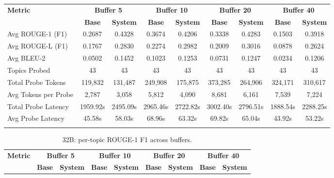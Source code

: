 \documentclass[pdflatex,sn-mathphys-num]{sn-jnl}%
\theoremstyle{thmstyleone}%
\theoremstyle{thmstyletwo}%
\theoremstyle{thmstylethree}%
\begin{document}
\begin{appendices}
\begin{landscape}
\begin{longtable}{@{}p{3.8cm}cccccccc@{}}
\toprule
\textbf{Metric} & \multicolumn{2}{c}{\textbf{Buffer 5}} & \multicolumn{2}{c}{\textbf{Buffer 10}} & \multicolumn{2}{c}{\textbf{Buffer 20}} & \multicolumn{2}{c}{\textbf{Buffer 40}} \\
\cmidrule(lr){2-3}\cmidrule(lr){4-5}\cmidrule(lr){6-7}\cmidrule(lr){8-9}
 & \textbf{Base} & \textbf{System} & \textbf{Base} & \textbf{System} & \textbf{Base} & \textbf{System} & \textbf{Base} & \textbf{System} \\
\midrule
\endhead
Avg ROUGE-1 (F1) & 0.2687 & 0.4328 & 0.3674 & 0.4206 & 0.3338 & 0.4283 & 0.1503 & 0.3918 \\
Avg ROUGE-L (F1) & 0.1767 & 0.2830 & 0.2274 & 0.2982 & 0.2009 & 0.3016 & 0.0878 & 0.2624 \\
Avg BLEU-2 & 0.0502 & 0.1452 & 0.1023 & 0.1253 & 0.0731 & 0.1247 & 0.0234 & 0.1206 \\
Topics Probed & 43 & 43 & 43 & 43 & 43 & 43 & 43 & 43 \\
Total Probe Tokens & 119,832 & 131,487 & 249,908 & 175,875 & 373,285 & 264,906 & 324,171 & 310,617 \\
Avg Tokens per Probe & 2,787 & 3,058 & 5,812 & 4,090 & 8,681 & 6,161 & 7,539 & 7,224 \\
Total Probe Latency & 1959.92s & 2495.09s & 2965.46s & 2722.82s & 3002.40s & 2796.51s & 1888.54s & 2288.25s \\
Avg Probe Latency & 45.58s & 58.03s & 68.96s & 63.32s & 69.82s & 65.04s & 43.92s & 53.22s \\
\botrule
\end{longtable}
\normalsize
\end{landscape}
\begin{landscape}
\tiny
\begin{longtable}{@{}p{3.8cm}cccccccc@{}}
\caption{32B: per-topic ROUGE-1 F1 across buffers.}\label{tab:app_32b_rouge1_topics}\\

\toprule
\textbf{Metric} & \multicolumn{2}{c}{\textbf{Buffer 5}} & \multicolumn{2}{c}{\textbf{Buffer 10}} & \multicolumn{2}{c}{\textbf{Buffer 20}} & \multicolumn{2}{c}{\textbf{Buffer 40}} \\
\cmidrule(lr){2-3}\cmidrule(lr){4-5}\cmidrule(lr){6-7}\cmidrule(lr){8-9}
 & \textbf{Base} & \textbf{System} & \textbf{Base} & \textbf{System} & \textbf{Base} & \textbf{System} & \textbf{Base} & \textbf{System} \\
\midrule
\endfirsthead


\end{longtable}
\end{landscape}
\end{appendices}
\end{document}
